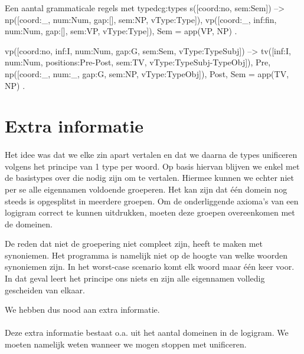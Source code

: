 
\begin{dcg}{Een aantal grammaticale regels met type}{dcg:types}
s([coord:no, sem:Sem]) -->
  np([coord:_, num:Num, gap:[], sem:NP, vType:Type]),
  vp([coord:_, inf:fin, num:Num, gap:[], sem:VP, vType:Type]),
  { Sem = app(VP, NP) }.

vp([coord:no, inf:I, num:Num, gap:G, sem:Sem, vType:TypeSubj]) -->
  tv([inf:I, num:Num, positions:Pre-Post, sem:TV, vType:TypeSubj-TypeObj]),
  Pre,
  np([coord:_, num:_, gap:G, sem:NP, vType:TypeObj]),
  Post,
  { Sem = app(TV, NP) }.
\end{dcg}

\section{Extra informatie}
\paragraph{} Het idee was dat we elke zin apart vertalen en dat we daarna de types unificeren volgens het principe van 1 type per woord. Op basis hiervan blijven we enkel met de basistypes over die nodig zijn om te vertalen. Hiermee kunnen we echter niet per se alle eigennamen voldoende groeperen. Het kan zijn dat één domein nog steeds is opgesplitst in meerdere groepen. Om de onderliggende axioma's van een logigram correct te kunnen uitdrukken, moeten deze groepen overeenkomen met de domeinen.

De reden dat niet de groepering niet compleet zijn, heeft te maken met synoniemen. Het programma is namelijk niet op de hoogte van welke woorden synoniemen zijn. In het worst-case scenario komt elk woord maar één keer voor. In dat geval leert het principe ons niets en zijn alle eigennamen volledig gescheiden van elkaar.

We hebben dus nood aan extra informatie.

\paragraph{} Deze extra informatie bestaat o.a. uit het aantal domeinen in de logigram. We moeten namelijk weten wanneer we mogen stoppen met unificeren.


